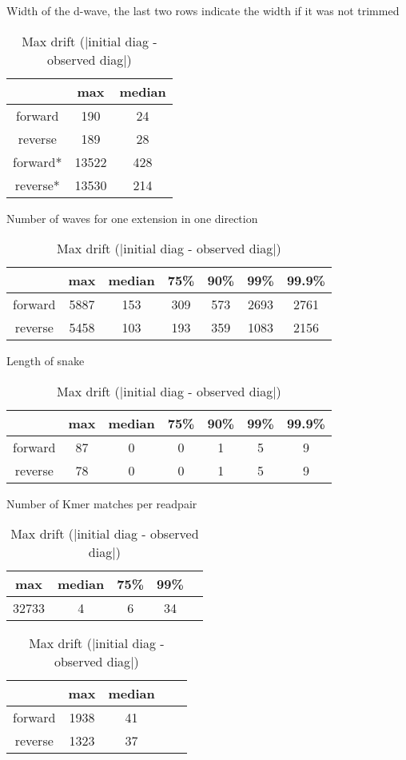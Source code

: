 \documentclass[../main/thesis.tex]{subfiles}
\begin{document}
\begin{table}[h]
\caption{Width of the d-wave, the last two rows indicate the width if it was not trimmed}
\label{tbl:daligner_dist1}
\centering
\vspace{-5pt}
\begin{tabular}{c|c c}
& max & median \\ \hline
forward & 190 & 24 \\
reverse & 189 & 28 \\ \hline
forward* & 13522 & 428 \\
reverse* & 13530 & 214 \\
\end{tabular}

\bigskip
\caption{Number of waves for one extension in one direction}
\label{tbl:daligner_dist2}
\centering
\vspace{-5pt}
\begin{tabular}{c|c c c c c c}
& max & median & 75\% & 90\% & 99\% & 99.9\% \\ \hline
forward & 5887 & 153 & 309 & 573 & 2693 & 2761 \\
reverse & 5458 & 103 & 193 & 359 & 1083 & 2156 \\
\end{tabular}

\bigskip
\caption{Length of snake}
\label{tbl:daligner_dist3}
\centering
\vspace{-5pt}
\begin{tabular}{c|c c c c c c}
& max & median & 75\% & 90\% & 99\% & 99.9\% \\ \hline
forward & 87 & 0 & 0 & 1 & 5 & 9 \\
reverse & 78 & 0 & 0 & 1 & 5 & 9 \\
\end{tabular}

\bigskip
\caption{Number of Kmer matches per readpair}
\label{tbl:daligner_dist4}
\centering
\vspace{-5pt}
\begin{tabular}{c|c c c c}
max & median & 75\% & 99\% \\ \hline
32733 & 4 & 6 & 34 \\
\end{tabular}

\bigskip
\caption{Max drift ($\mid$initial diag - observed diag$\mid$)}
\label{tbl:daligner_dist5}
\centering
\vspace{-5pt}
\begin{tabular}{c|c c c c}
& max & median \\ \hline
forward & 1938 & 41 \\
reverse & 1323 & 37 \\
\end{tabular}


\end{table}
\end{document}
